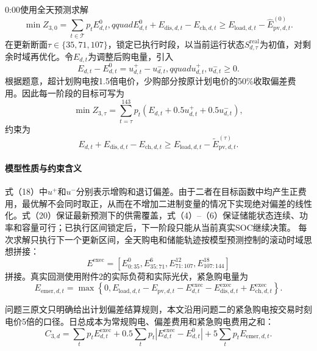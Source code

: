 \documentclass{cumcmthesis}
\newcommand{\Tset}{\mathcal{T}}
\begin{document}
0:00使用全天预测求解
\begin{equation}
\min Z_{3,0}=\sum_{t\in\Tset}p_tE^0_{d,t},qquad
E^0_{d,t}+E_{\mathrm{dis},d,t}-E_{\mathrm{ch},d,t}
\geq E_{\mathrm{load},d,t}-\widehat E^{(0)}_{\mathrm{pv},d,t}.
\tag{17}
\end{equation}
在更新断面$\tau\in\{35,71,107\}$，锁定已执行时段，以当前运行状态$S_{d,\tau}^{\mathrm{real}}$为初值，对剩余时域再优化。令$E_{d,t}$为调整后购电量，引入
\begin{equation}
E_{d,t}-E^0_{d,t}=u^+_{d,t}-u^-_{d,t},qquad u^+_{d,t},u^-_{d,t}\geq0.
\tag{18}
\end{equation}
根据题意，超计划购电按1.5倍电价，少购部分按原计划电价的50\%收取偏差费用。因此每一阶段的目标可写为
\begin{equation}
\min Z_{3,\tau}=\sum_{t=\tau}^{143}p_t
\left(E_{d,t}+0.5u^+_{d,t}+0.5u^-_{d,t}\right),
\tag{19}
\end{equation}
约束为
\begin{equation}
E_{d,t}+E_{\mathrm{dis},d,t}-E_{\mathrm{ch},d,t}
\geq E_{\mathrm{load},d,t}-\widetilde E_{\mathrm{pv},d,t}^{(\tau)}.
\tag{20}
\end{equation}
\paragraph{模型性质与约束含义}
式（18）中$u^+$和$u^-$分别表示增购和退订偏差。由于二者在目标函数中均产生正费用，最优解不会同时取正，从而在不增加二进制变量的情况下实现绝对偏差的线性化。式（20）保证最新预测下的供需覆盖，式（4）--（6）保证储能状态连续、功率和容量可行；已执行区间锁定后，下一阶段只能从当前真实SOC继续决策。
每次求解只执行下一个更新区间，全天购电和储能轨迹按模型预测控制的滚动时域思想拼接\cite{maciejowski2002,parisio2014}：
\begin{equation}
E^{\mathrm{exec}}=\left[E^0_{0:35},E^6_{35:71},E^{12}_{71:107},E^{18}_{107:144}\right]
\tag{21}
\end{equation}
拼接。真实回测使用附件2的实际负荷和实际光伏，紧急购电量为
\begin{equation}
E_{\mathrm{emer},d,t}=\max\left\{0,E_{\mathrm{load},d,t}-E_{\mathrm{pv},d,t}
-E^{\mathrm{exec}}_{d,t}-E^{\mathrm{exec}}_{\mathrm{dis},d,t}
+E^{\mathrm{exec}}_{\mathrm{ch},d,t}\right\}.
\tag{22}
\end{equation}

问题三原文只明确给出计划偏差结算规则，本文沿用问题二的紧急购电按交易时刻电价5倍的口径。日总成本为常规购电、偏差费用和紧急购电费用之和：
\begin{equation}
C_{3,d}=\sum_t p_tE^{\mathrm{exec}}_{d,t}
+0.5\sum_t p_t|E^{\mathrm{exec}}_{d,t}-E^0_{d,t}|
+5\sum_t p_tE_{\mathrm{emer},d,t}.
\tag{23}
\end{equation}
\end{document}
